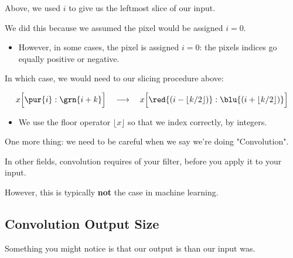         \begin{clarification}
            Above, we used $i$ to give us the leftmost slice of our input.

            We did this because we assumed the  pixel would be assigned $i=0$.

            \begin{itemize}

                \item However, in some cases, the  pixel is assigned $i=0$: the pixels indices go equally positive or negative.
            \end{itemize}

            

            In which case, we would need to  our slicing procedure above:

            \begin{equation*}
                x \Big[ \pur{i}:\grn{i+k} \Big] 
                \quad\longrightarrow\quad
                x \Big[ \red{(i- \lfloor k/2 \rfloor)}:\blu{(i+ \lfloor k/2 \rfloor)} \Big]
            \end{equation*}

            \begin{itemize}
                \item We use the floor operator $\lfloor x \rfloor$ so that we index correctly, by integers.
            \end{itemize}
        \end{clarification}

        One more thing: we need to be careful when we say we're doing "Convolution".\\

        \begin{clarification}
            In other fields, convolution requires  of your filter, before you apply it to your input.

            However, this is typically \textbf{not} the case in machine learning.
        \end{clarification}

        \pagebreak

    \subsection{Convolution Output Size}

        Something you might notice is that our output is  than our input was.

